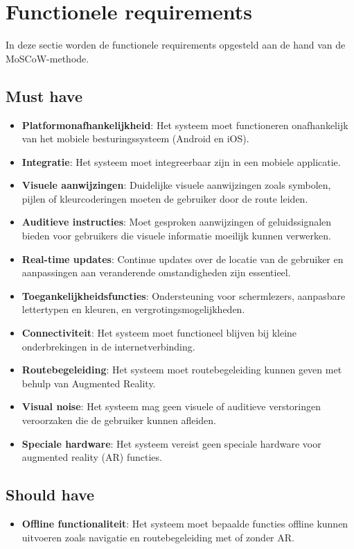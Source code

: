 \section{Functionele requirements}
\label{sec:functionele-requirements}

In deze sectie worden de functionele requirements opgesteld aan de hand van de MoSCoW-methode.

\subsection*{Must have}
\begin{itemize}
    \item \textbf{Platformonafhankelijkheid}: Het systeem moet functioneren onafhankelijk van het mobiele besturingssysteem (Android en iOS).
    \item \textbf{Integratie}: Het systeem moet integreerbaar zijn in een mobiele applicatie.
    \item \textbf{Visuele aanwijzingen}: Duidelijke visuele aanwijzingen zoals symbolen, pijlen of kleurcoderingen moeten de gebruiker door de route leiden.
    \item \textbf{Auditieve instructies}: Moet gesproken aanwijzingen of geluidssignalen bieden voor gebruikers die visuele informatie moeilijk kunnen verwerken.
    \item \textbf{Real-time updates}: Continue updates over de locatie van de gebruiker en aanpassingen aan veranderende omstandigheden zijn essentieel.
    \item \textbf{Toegankelijkheidsfuncties}: Ondersteuning voor schermlezers, aanpasbare lettertypen en kleuren, en vergrotingsmogelijkheden.
    \item \textbf{Connectiviteit}: Het systeem moet functioneel blijven bij kleine onderbrekingen in de internetverbinding.
    \item \textbf{Routebegeleiding}: Het systeem moet routebegeleiding kunnen geven met behulp van Augmented Reality.
    \item \textbf{Visual noise}: Het systeem mag geen visuele of auditieve verstoringen veroorzaken die de gebruiker kunnen afleiden.
    \item \textbf{Speciale hardware}: Het systeem vereist geen speciale hardware voor augmented reality (AR) functies.
\end{itemize}

\subsection*{Should have}
\begin{itemize}
    \item \textbf{Offline functionaliteit}: Het systeem moet bepaalde functies offline kunnen uitvoeren zoals navigatie en routebegeleiding met of zonder AR.
\end{itemize}

